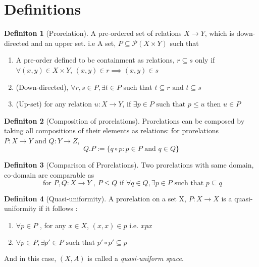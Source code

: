 \documentclass[18pt,a4paper]{article}
\theoremstyle{definition}
\newtheorem{definition}{Definiton}[section]
\begin{document}
\section{Definitions}%
\label{sec:definitions}

\begin{definition}[Prorelation] %
A pre-ordered set of relations $X \to Y$, which is down-directed and an upper set. i.e
A set, $P \subseteq \mathcal{P}(X \times Y)$ such that
	\begin{enumerate}[label=(\roman*)]
		\item A pre-order defined to be containment as relations, $r \subseteq s$
			only if $\forall (x,y) \in X \times Y$, $(x,y) \in r \implies (x,y)\in s$
		\item (Down-directed), $\forall r,s \in P, \exists t \in P $ such that
			$t\subseteq r \text{ and } t \subseteq s$
		\item (Up-set) for any relation $u:X\to Y$, if $\exists p \in P \text{ such that } p\leq u $
			then $u \in P$
\end{enumerate} \end{definition} %
\begin{definition}[Composition of prorelations] %
	Prorelations can be composed by taking all compositions of their elements as relations:
	for prorelations $P:X\to Y \text{ and } Q:Y\to Z$,
	\[ Q.P:=\{q \circ p : p \in P \text{ and } q \in Q  \} \]
\end{definition}
\begin{definition}[Comparison of Prorelations] %
Two prorelations with same domain, co-domain are comparable as
\[ \text{ for }  P,Q:X \to Y \text{ , } P \leq Q \text{ if } \forall q \in Q, \exists p \in P
\text{ such that } p \subseteq q    \]
\end{definition}
\begin{definition}[Quasi-uniformity] %
A prorelation on a set X, $P:X \to X$ is a quasi-uniformity if it follows :
\begin{enumerate}[label=\roman*]
	\item $\forall p \in P $ , for any $x \in X$, $(x,x) \in p$ i.e. $xpx$
	\item $\forall p \in P, \exists p' \in P \text{ such that } p' \circ p' \subseteq p$
\end{enumerate}
And in this case, $(X,A)$ is called a \textit{quasi-uniform space}.
\end{definition}
\end{document}
